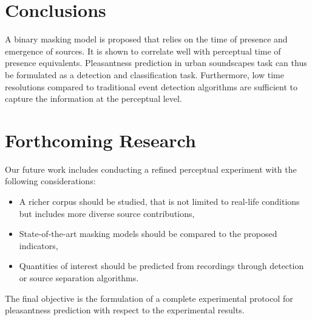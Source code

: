 \documentclass[a0,portrait]{a0poster}
\begin{document}
\begin{multicols}{2}

\color{SaddleBrown} %

\section*{Conclusions}

A binary masking model is proposed that relies on the time of presence and emergence of sources. It is shown to correlate well with perceptual time of presence equivalents. Pleasantness prediction in urban soundscapes task can thus be formulated as a detection and classification task. Furthermore, low time resolutions compared to traditional event detection algorithms are sufficient to capture the information at the perceptual level.



\color{DarkSlateGray} %


\section*{Forthcoming Research}

Our future work includes conducting a refined perceptual experiment with the following considerations:
\begin{itemize}
\item A richer corpus should be studied, that is not limited to real-life conditions but includes more diverse source contributions,
\item State-of-the-art masking models should be compared to the proposed indicators,
\item Quantities of interest should be predicted from recordings through detection or source separation algorithms.
\end{itemize}
The final objective is the formulation of a complete experimental protocol for pleasantness prediction with respect to the experimental results.





\end{multicols}
\end{document}
